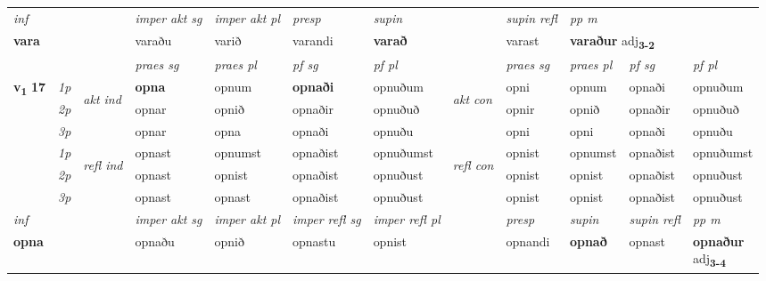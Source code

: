 \begin{longtable}[l]{X>{\footnotesize\itshape}llXXXXlXXXX}
   {\textit{inf}} & &  & \textit{imper akt sg} & \textit{imper akt pl}   & \textit{presp} & \textit{supin} && \textit{supin refl} & \textit{pp m} \\*
  {\textbf{vara}} & && varaðu  & varið   & varandi &  \textbf{varað} && varast & \multicolumn{2}{l}{\textbf{varaður} adj\textbf{\textsubscript{3-2}}} \\*

\midrule

 & &   & \textit{praes sg}  & \textit{praes pl}    & \textit{ pf sg} & \textit{pf pl} & & \textit{praes sg}  & \textit{praes pl}    & \textit{pf sg} & \textit{pf pl }  \\ \cmidrule{4-7} \cmidrule{9-12}
 \multirow{2}{*}{{{\textbf{v{\textsubscript{1}}} \Large{\textbf{17}}}}}  & 1p & \multirow{3}{*}{\begin{turn}{90}\textit{akt ind}\end{turn}} & \textbf{opna} & opnum & \textbf{opnaði} & opnuðum & \multirow{3}{*}{\begin{turn}{90}\textit{akt con}\end{turn}} &opni & opnum & opnaði & opnuðum\\*
 & 2p &  &  opnar  & opnið & opnaðir & opnuðuð & & opnir & opnið & opnaðir & opnuðuð \\*
 & 3p &  & opnar & opna & opnaði & opnuðu & & opni & opni& opnaði & opnuðu \\*
\cmidrule{4-7} \cmidrule{9-12}
 & 1p & \multirow{3}{*}{\begin{turn}{90}\textit{refl ind}\end{turn}}  & opnast & opnumst & opnaðist & opnuðumst & \multirow{3}{*}{\begin{turn}{90}\textit{refl con}\end{turn}}  &opnist & opnumst & opnaðist & opnuðumst \\*
 & 2p &  & opnast & opnist & opnaðist & opnuðust & &opnist & opnist & opnaðist & opnuðust \\*
 & 3p  & & opnast & opnast & opnaðist & opnuðust & & opnist & opnist& opnaðist & opnuðust \\*
\cmidrule{4-7} \cmidrule{9-12}

   {\textit{inf}} & &  & \textit{imper akt sg} & \textit{imper akt pl} & \textit{imper refl sg} & \textit{imper refl pl} && \textit{presp} & \textit{supin} & \textit{supin refl} & \textit{pp m} \\*
  {\textbf{opna}} & && opnaðu  & opnið & opnastu & opnist && opnandi &  \textbf{opnað} & opnast & \specialcell{\textbf{opnaður} \\ adj\textbf{\textsubscript{3-4}}} \\*


\end{longtable}
